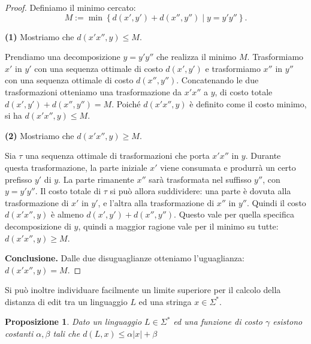 \documentclass[a4paper,12pt]{report}
\theoremstyle{propositionstyle}
\newtheorem{prop}{Proposizione}[chapter]
\begin{document}
    \begin{proof}
        Definiamo il minimo cercato:
        \[
            M := \min\left\{d\left(x', y'\right) + d\left(x'', y''\right) \mid y = y'y''\right\}.
        \]

        \textbf{(1)} Mostriamo che $d\left(x'x'', y\right) \leq M$.

        Prendiamo una decomposizione $y = y'y''$ che realizza il minimo $M$. Trasformiamo $x'$ in $y'$ con una sequenza ottimale di costo $d\left(x', y'\right)$ e trasformiamo $x''$ in $y''$ con una sequenza ottimale di costo $d\left(x'', y''\right)$.
        Concatenando le due trasformazioni otteniamo una trasformazione da $x'x''$ a $y$, di costo totale $d\left(x', y'\right) + d\left(x'', y''\right) = M$.
        Poiché $d\left(x'x'', y\right)$ è definito come il costo minimo, si ha $d\left(x'x'', y\right) \leq M$.

        \vspace{0.5em}

        \textbf{(2)} Mostriamo che $d\left(x'x'', y\right) \geq M$.

        Sia $\tau$ una sequenza ottimale di trasformazioni che porta $x'x''$ in $y$.
        Durante questa trasformazione, la parte iniziale $x'$ viene consumata e produrrà un certo prefisso $y'$ di $y$.
        La parte rimanente $x''$ sarà trasformata nel suffisso $y''$, con $y = y'y''$.
        Il costo totale di $\tau$ si può allora suddividere: una parte è dovuta alla trasformazione di $x'$ in $y'$, e l'altra alla trasformazione di $x''$ in $y''$.
        Quindi il costo $d\left(x'x'', y\right)$ è almeno $d\left(x', y'\right) + d\left(x'', y''\right)$.
        Questo vale per quella specifica decomposizione di $y$, quindi a maggior ragione vale per il minimo su tutte: $d\left(x'x'', y\right) \geq M$.

        \vspace{0.5em}

        \textbf{Conclusione.} Dalle due disuguaglianze otteniamo l'uguaglianza: $d\left(x'x'', y\right) = M$.
    \end{proof}

    Si può inoltre individuare facilmente un limite superiore per il calcolo della distanza di edit
    tra un linguaggio $L$ ed una stringa $x \in \Sigma^*$.

    \begin{prop}\label{prop:distanza-limitata}
        Dato un linguaggio $L \in \Sigma^*$ ed una funzione di costo $\gamma$ esistono costanti $\alpha, \beta$ tali che
        $d\left(L, x\right) \leq \alpha \lvert x \rvert + \beta$
    \end{prop}
\end{document}
